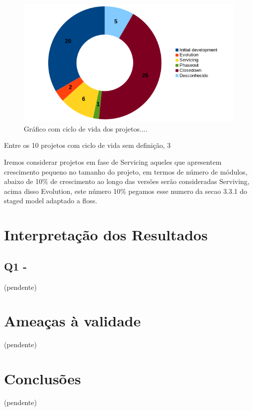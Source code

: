 \begin{figure}[h]
  \centering
 \includegraphics[scale=0.6]{imagens/life-cycle-pie.png}
  \caption{Gráfico com ciclo de vida dos projetos....}
  \label{life-cycle-pie}
\end{figure}

Entre os 10 projetos com ciclo de vida sem definição, 3

Iremos considerar projetos em fase de Servicing aqueles que apresentem crescimento
pequeno no tamanho do projeto, em termos de número de módulos, abaixo de 10\% de crescimento
ao longo das versões serão consideradas Serviving, acima disso Evolution, este número 10\%
pegamos esse numero da secao 3.3.1 do staged model adaptado a floss.

\section{Interpretação dos Resultados} \label{estudo3:interpretacao}

\subsection{Q1 - \EstudoDoisQuestaoUm}

(pendente)

\section{Ameaças à validade}

(pendente)

\section{Conclusões} \label{estudo3:conclusoes}

(pendente)



